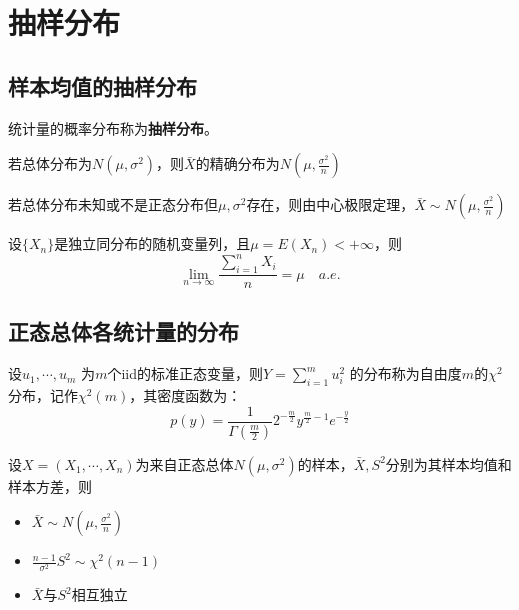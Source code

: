 \documentclass[UTF-8]{ctexbeamer}
\begin{document}
\section{抽样分布}

\subsection{样本均值的抽样分布}
\begin{frame}
  \begin{Def}
    统计量的概率分布称为\textbf{抽样分布}。
  \end{Def}
  若总体分布为$N(\mu,\sigma^2)$，则$\bar X$的精确分布为$N(\mu,\frac{\sigma^2}{n})$

  若总体分布未知或不是正态分布但$\mu,\sigma^2$存在，则由中心极限定理，$\bar X\sim N(\mu,\frac{\sigma^2}{n})$

  \begin{Thm}
    设$\{X_{n}\}$是独立同分布的随机变量列，且$\mu=E(X_{n})<+\infty$，则
    \[\lim\limits_{n\to\infty}\frac{\sum_{i=1}^{n} X_{i}}{n}=\mu\quad a.e.\]
  \end{Thm}
\end{frame}

\subsection{正态总体各统计量的分布}
\begin{frame}
  \begin{Def}
  设$u_1,\cdots,u_m$ 为$m$个iid的标准正态变量，则$Y=\sum_{i=1}^m u_i^2$ 的分布称为自由度$m$的$\chi^2$分布，记作$\chi^2(m)$，其密度函数为：
\[p(y)=\frac{1}{\Gamma(\frac{m}{2})}2^{-\frac{m}{2}}y^{\frac{m}{2}-1}e^{-\frac{y}{2}}\]
\end{Def}
\begin{Thm}
  设$X=(X_1,\cdots,X_n)$为来自正态总体$N(\mu,\sigma^2)$的样本，$\bar X,S^2$分别为其样本均值和样本方差，则
\begin{itemize}
\item $\bar X\sim N(\mu,\frac{\sigma^2}{n})$
  
\item $\frac{n-1}{\sigma^2}S^2\sim\chi^2(n-1)$
  
\item $\bar X$与$S^2$相互独立
\end{itemize}

\end{Thm}
\end{frame}
\end{document}
